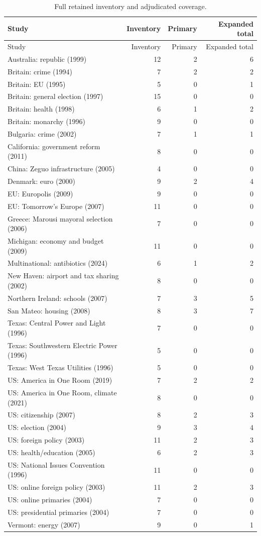 \begin{longtable}{>{\raggedright\arraybackslash}p{8.5cm}rrr}
\caption{Full retained inventory and adjudicated coverage.}\label{tab:coverage}\\
\toprule Study & Inventory & Primary & Expanded total \\
\midrule\endfirsthead
\toprule Study & Inventory & Primary & Expanded total \\
\midrule\endhead
Australia: republic (1999) & 12 & 2 & 6 \\
Britain: crime (1994) & 7 & 2 & 2 \\
Britain: EU (1995) & 5 & 0 & 1 \\
Britain: general election (1997) & 15 & 0 & 0 \\
Britain: health (1998) & 6 & 1 & 2 \\
Britain: monarchy (1996) & 9 & 0 & 0 \\
Bulgaria: crime (2002) & 7 & 1 & 1 \\
California: government reform (2011) & 8 & 0 & 0 \\
China: Zeguo infrastructure (2005) & 4 & 0 & 0 \\
Denmark: euro (2000) & 9 & 2 & 4 \\
EU: Europolis (2009) & 9 & 0 & 0 \\
EU: Tomorrow's Europe (2007) & 11 & 0 & 0 \\
Greece: Marousi mayoral selection (2006) & 7 & 0 & 0 \\
Michigan: economy and budget (2009) & 11 & 0 & 0 \\
Multinational: antibiotics (2024) & 6 & 1 & 2 \\
New Haven: airport and tax sharing (2002) & 8 & 0 & 0 \\
Northern Ireland: schools (2007) & 7 & 3 & 5 \\
San Mateo: housing (2008) & 8 & 3 & 7 \\
Texas: Central Power and Light (1996) & 7 & 0 & 0 \\
Texas: Southwestern Electric Power (1996) & 5 & 0 & 0 \\
Texas: West Texas Utilities (1996) & 5 & 0 & 0 \\
US: America in One Room (2019) & 7 & 2 & 2 \\
US: America in One Room, climate (2021) & 8 & 0 & 0 \\
US: citizenship (2007) & 8 & 2 & 3 \\
US: election (2004) & 9 & 3 & 4 \\
US: foreign policy (2003) & 11 & 2 & 3 \\
US: health/education (2005) & 6 & 2 & 3 \\
US: National Issues Convention (1996) & 11 & 0 & 0 \\
US: online foreign policy (2003) & 11 & 2 & 3 \\
US: online primaries (2004) & 7 & 0 & 0 \\
US: presidential primaries (2004) & 7 & 0 & 0 \\
Vermont: energy (2007) & 9 & 0 & 1 \\
\bottomrule
\end{longtable}
